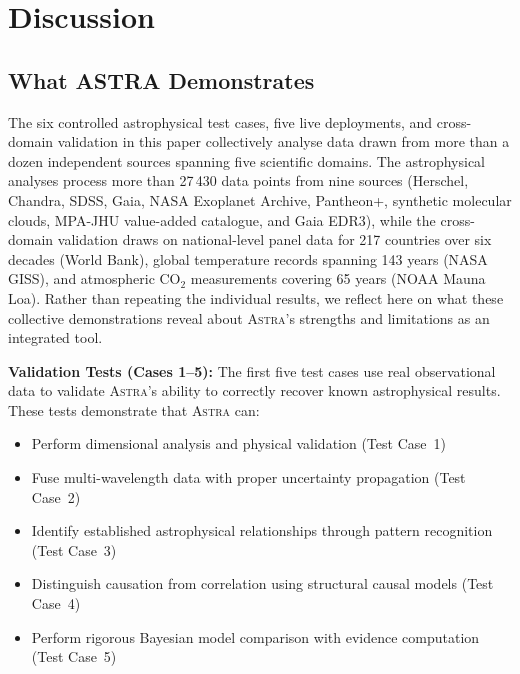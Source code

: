 \documentclass[usenatbib]{rasti}
\newcommand{\astra}{\textsc{Astra}\xspace}
\begin{document}
\section{Discussion}
\label{sec:discussion}

\subsection{What ASTRA Demonstrates}
\label{sec:discussion:demonstrates}

The six controlled astrophysical test cases, five live deployments, and cross-domain validation in this paper collectively analyse data drawn from more than a dozen independent sources spanning five scientific domains.
The astrophysical analyses process more than 27\,430 data points from nine sources (Herschel, Chandra, SDSS, Gaia, NASA Exoplanet Archive, Pantheon+, synthetic molecular clouds, MPA-JHU value-added catalogue, and Gaia EDR3), while the cross-domain validation draws on national-level panel data for 217 countries over six decades (World Bank), global temperature records spanning 143 years (NASA GISS), and atmospheric CO$_{2}$ measurements covering 65 years (NOAA Mauna Loa).
Rather than repeating the individual results, we reflect here on what these collective demonstrations reveal about \astra's strengths and limitations as an integrated tool.

\textbf{Validation Tests (Cases 1--5):}
The first five test cases use real observational data to validate \astra's ability to correctly recover known astrophysical results.
These tests demonstrate that \astra can:
\begin{itemize}
  \item Perform dimensional analysis and physical validation (Test Case~1)
  \item Fuse multi-wavelength data with proper uncertainty propagation (Test Case~2)
  \item Identify established astrophysical relationships through pattern recognition (Test Case~3)
  \item Distinguish causation from correlation using structural causal models (Test Case~4)
  \item Perform rigorous Bayesian model comparison with evidence computation (Test Case~5)
\end{itemize}
\end{document}
